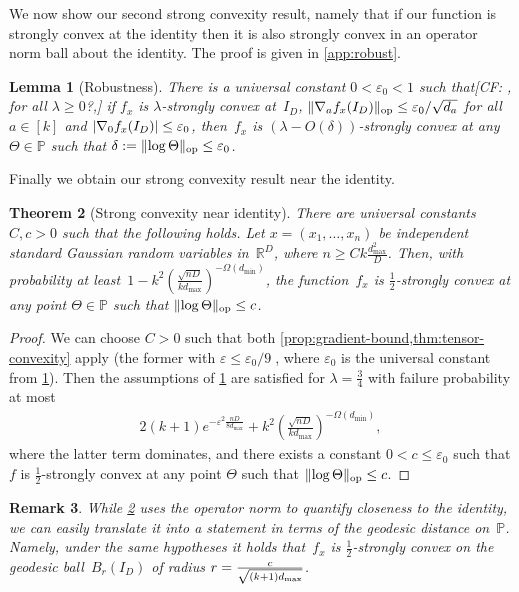\documentclass[aos]{imsart}
\newtheorem{theorem}{Theorem}[section]
\newtheorem{lemma}[theorem]{Lemma}
\newtheorem{remark}[theorem]{Remark}
\theoremstyle{definition}
\numberwithin{equation}{section}
\DeclareMathOperator{\op}{op}
\DeclarePairedDelimiter{\abs}{\lvert}{\rvert}
\DeclarePairedDelimiter{\norm}{\lVert}{\rVert}
\newcommand{\R}{{\mathbb{R}}}
\renewcommand{\P}{{\mathbb{P}}}
\newcommand{\eps}{\varepsilon}
\newcommand{\samp}{x}
\def\dmax{d_{\max}}
\newcommand{\CF}[1]{{\color{purple}[CF: #1]}}
\begin{document}
We now show our second strong convexity result, namely that if our function is strongly convex at the identity then it is also strongly convex in an operator norm ball about the identity.
The proof is given in \cref{app:robust}.

\begin{lemma}[Robustness]\label{convexRobustness}
There is a universal constant $0 < \eps_0 < 1$ such that\CF{, for all $\lambda \geq 0$?,} if $f_x$ is $\lambda$-strongly convex at~$I_D$, $\norm{\nabla_a f_x(I_D)}_{\op} \leq \eps_0/\sqrt{d_a}$ for all $a\in[k]$ and $\abs{\nabla_{0} f_{\samp}(I_{D})} \leq \eps_0$, then~$f_x$ is $(\lambda-O(\delta))$-strongly convex at any $\Theta\in\P$ such that $\delta := \norm{\log\Theta}_{\op} \leq \eps_0$.
\end{lemma}

Finally we obtain our strong convexity result near the identity.

\begin{theorem}[Strong convexity near identity]\label{thm:ball-convexity}
There are universal constants $C,c>0$ such that the following holds.
Let $x = (x_1,\dots,x_n)$ be independent standard Gaussian random variables in~$\R^D$, where $n \geq C k \frac{\dmax^2}D$.
Then, with probability at least~$1 - k^2 ( \frac{\sqrt{nD}}{k \dmax} )^{-\Omega(d_{\min})}$,
the function~$f_x$ is $\frac12$-strongly convex at any point $\Theta\in\P$ such that $\norm{\log\Theta}_{\op} \leq c$.
\end{theorem}
\begin{proof}
We can choose $C>0$ such that both \cref{prop:gradient-bound,thm:tensor-convexity} apply (the former with $\eps\leq\eps_0/9\; $, where $\eps_0$ is the universal constant from \cref{convexRobustness}).
Then the assumptions of \cref{convexRobustness} are satisfied for $\lambda=\frac34$ with failure probability at most
\begin{align*}
  2(k+1)e^{-\eps^2 \frac{nD}{8\dmax}} + k^2 \left( \frac{\sqrt{nD}}{k \dmax} \right)^{-\Omega(d_{\min})},
\end{align*}
where the latter term dominates, and there exists a constant $0<c\leq\eps_0$ such that $f$ is $\frac12$-strongly convex at any point $\Theta$ such that $\norm{\log\Theta}_{\op} \leq c$.
\end{proof}

\begin{remark}\label{remark-strong-convexity-balls}
While \cref{thm:ball-convexity} uses the operator norm to quantify closeness to the identity, we can easily translate it into a statement in terms of the geodesic distance on~$\P$.
Namely, under the same hypotheses it holds that~$f_x$ is $\frac12$-strongly convex on the geodesic ball~$B_r(I_D)$ of radius $r=\smash{\frac c{\sqrt{(k+1)\dmax}}}$.
\end{remark}
\end{document}
